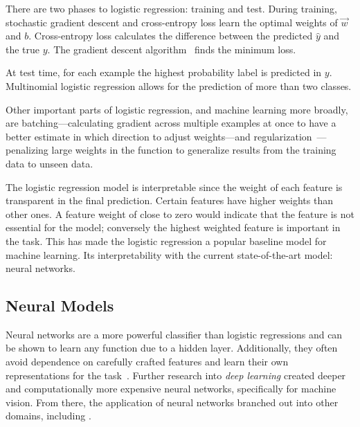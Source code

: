 There are two phases to logistic regression: training and test.  
%
During training, stochastic gradient descent and cross-entropy loss learn the optimal weights of $\vec{w}$ and $b$.
%
Cross-entropy loss calculates the difference between the predicted $\hat{y}$ and the true $y$.  
%
The gradient descent algorithm~\citep{bottou2010large, ruder2016overview} finds the minimum loss.  

At test time, for each example the highest probability label is predicted in $y$.  
Multinomial logistic regression allows for the prediction of more than two classes.  

Other important parts of logistic regression, and machine learning more broadly, are batching---calculating gradient across multiple examples at once to have a better estimate in which direction to adjust weights---and regularization~\citep{tibshirani1996regression}---penalizing large weights in the function to generalize results from the training data to unseen data.

The logistic regression model is interpretable since the weight of each feature is transparent in the final prediction.  
%
Certain features have higher weights than other ones.  
%
A feature weight of close to zero would indicate that the feature is not essential for the model; conversely the highest weighted feature is important in the task.  
%
This has made the logistic regression a popular baseline model for machine learning.
%
Its interpretability with the current state-of-the-art model: neural networks.  








\subsection{Neural Models}

%

Neural networks are a more powerful classifier than logistic regressions and can be shown to learn any function due to a hidden layer.  
%
Additionally, they often avoid dependence on carefully crafted features and learn their own representations for the task~\citep{jurafsky2000speech}. 
%
Further research into \textit{deep learning} created deeper and computationally more expensive neural networks, specifically for machine vision.  
%
From there, the application of neural networks branched out into other domains, including \nlp{}.


